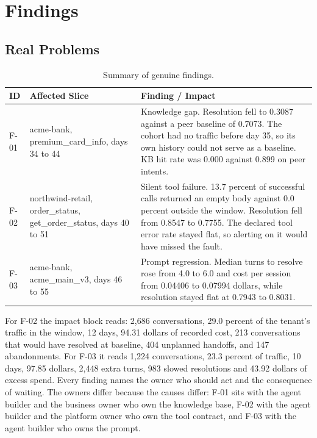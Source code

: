 \documentclass[8pt,twocolumn,a4paper]{extarticle}
\begin{document}

\section{Findings}

\subsection{Real Problems}

\begin{table}[t]
\centering
\caption{Summary of genuine findings.}
\label{tab:findings}
\small
\begin{tabular}{p{}p{}p{}}
\toprule
\textbf{ID} & \textbf{Affected Slice} & \textbf{Finding / Impact} \\
\midrule
F-01 & acme-bank, premium\_card\_info, days 34 to 44 & Knowledge gap. Resolution fell to 0.3087 against a peer baseline of 0.7073. The cohort had no traffic before day 35, so its own history could not serve as a baseline. KB hit rate was 0.000 against 0.899 on peer intents. \\
F-02 & northwind-retail, order\_status, get\_order\_status, days 40 to 51 & Silent tool failure. 13.7 percent of successful calls returned an empty body against 0.0 percent outside the window. Resolution fell from 0.8547 to 0.7755. The declared tool error rate stayed flat, so alerting on it would have missed the fault. \\
F-03 & acme-bank, acme\_main\_v3, days 46 to 55 & Prompt regression. Median turns to resolve rose from 4.0 to 6.0 and cost per session from 0.04406 to 0.07994 dollars, while resolution stayed flat at 0.7943 to 0.8031. \\
\bottomrule
\end{tabular}
\end{table}

For F-02 the impact block reads: 2,686 conversations, 29.0 percent of
the tenant's traffic in the window, 12 days, 94.31 dollars of recorded
cost, 213 conversations that would have resolved at baseline, 404
unplanned handoffs, and 147 abandonments. For F-03 it reads 1,224
conversations, 23.3 percent of traffic, 10 days, 97.85 dollars, 2,448
extra turns, 983 slowed resolutions and 43.92 dollars of excess spend.
Every finding names the owner who should act and the consequence of
waiting. The owners differ because the causes differ: F-01 sits with the
agent builder and the business owner who own the knowledge base, F-02
with the agent builder and the platform owner who own the tool contract,
and F-03 with the agent builder who owns the prompt.
\end{document}
